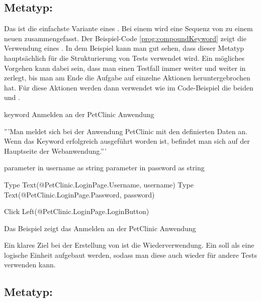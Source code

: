 \subsection{Metatyp: }

Das  ist die einfachste Variante eines . Bei einem  wird eine Sequenz von  zu einem neuen  zusammengefasst. Der Beispiel-Code \ref{prog:compoundKeyword} zeigt die Verwendung eines . In dem Beispiel kann man gut sehen, dass dieser Metatyp hauptsächlich für die Strukturierung von Tests verwendet wird. Ein mögliches Vorgehen kann dabei sein, dass man einen Testfall immer weiter und weiter in  zerlegt, bis man am Ende die Aufgabe auf einzelne Aktionen heruntergebrochen hat. Für diese Aktionen werden dann  verwendet wie im Code-Beispiel die beiden   und .

\begin{program}
\begin{JavaCode}
keyword Anmelden an der PetClinic Anwendung {
	'''Man meldet sich bei der Anwendung PetClinic mit den definierten 
	   Daten an. Wenn das Keyword erfolgreich ausgeführt worden ist, 
	   befindet man sich auf der Hauptseite der Webanwendung.'''
	
	parameter in username as string
	parameter in password as string
	
	Type Text(@PetClinic.LoginPage.Username, username)
	Type Text(@PetClinic.LoginPage.Password, password)
	
	Click Left(@PetClinic.LoginPage.LoginButton)
}
\end{JavaCode}
\caption{Das Beispiel zeigt das  Anmelden an der PetClinic Anwendung}
\label{prog:compoundKeyword}
\end{program}

\SuperPar
Ein klares Ziel bei der Erstellung von  ist die Wiederverwendung. Ein  soll als eine logische Einheit aufgebaut werden, sodass man diese auch wieder für andere Tests verwenden kann. 


\subsection{Metatyp: }

